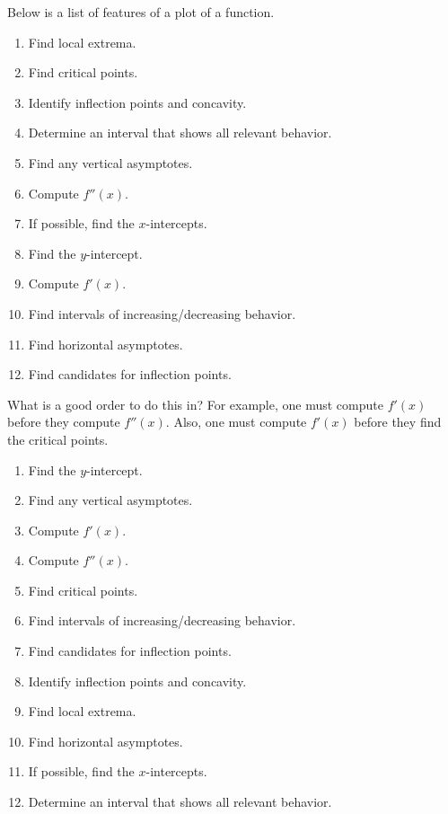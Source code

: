 \documentclass{ximera}
\begin{document}
\begin{problem}%
  Below is a list of features of a plot of a function.
  \begin{enumerate}
  \item Find local extrema.
  \item Find critical points.
  \item Identify inflection points and concavity.
  \item Determine an interval that shows all relevant behavior. \item Find any vertical asymptotes.
  \item Compute $f''(x)$.
  \item If possible, find the $x$-intercepts.
  \item Find the $y$-intercept.
  \item Compute $f'(x)$.
  \item Find intervals of increasing/decreasing behavior.
  \item Find horizontal asymptotes.
  \item Find candidates for inflection points.
 \end{enumerate}
  What is a good order to do this in? For example, one must compute $f'(x)$ before they compute $f''(x)$. Also, one must compute $f'(x)$ before they find the critical points.
  \begin{freeResponse}
    \begin{enumerate}
  \item Find the $y$-intercept.
  \item Find any vertical asymptotes.
  \item Compute $f'(x)$.
  \item Compute $f''(x)$.
  \item Find critical points.
  \item Find intervals of increasing/decreasing behavior.
  \item Find candidates for inflection points.
  \item Identify inflection points and concavity.
  \item Find local extrema.
  \item Find horizontal asymptotes.
  \item If possible, find the $x$-intercepts.
  \item Determine an interval that shows all relevant behavior. 
  \end{enumerate}
  \end{freeResponse}
\end{problem}



\end{document}
